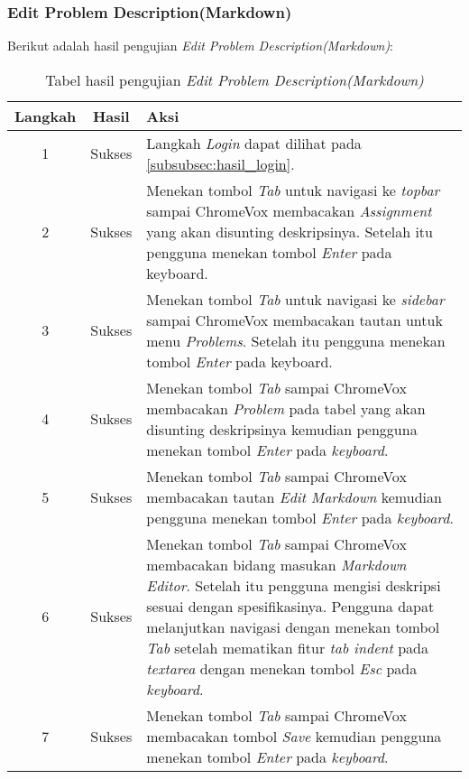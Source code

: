 \subsubsection{Edit Problem Description(Markdown)}
\label{subsubsec:hasil_edit_problem_description_markdown}
Berikut adalah hasil pengujian \textit{Edit Problem Description(Markdown)}:

\begin{table}[H]
	\centering
	\caption{Tabel hasil pengujian \textit{Edit Problem Description(Markdown)}}
	\label{tab:hasil_edit_problem_description_markdown}
	\begin{tabular}{|c|c|p{12cm}|}
		\toprule
		Langkah & Hasil & Aksi\\
		\midrule
		1 & Sukses & Langkah \textit{Login} dapat dilihat pada \ref{subsubsec:hasil_login}.\\
		2 & Sukses & Menekan tombol \textit{Tab} untuk navigasi ke \textit{topbar} sampai ChromeVox membacakan \textit{Assignment} yang akan disunting deskripsinya. Setelah itu pengguna menekan tombol \textit{Enter} pada keyboard.\\
		3 & Sukses & Menekan tombol \textit{Tab} untuk navigasi ke \textit{sidebar} sampai ChromeVox membacakan tautan untuk menu \textit{Problems}. Setelah itu pengguna menekan tombol \textit{Enter} pada keyboard.\\
		4 & Sukses & Menekan tombol \textit{Tab} sampai ChromeVox membacakan \textit{Problem} pada tabel yang akan disunting deskripsinya kemudian pengguna menekan tombol \textit{Enter} pada \textit{keyboard}.\\
		5 & Sukses & Menekan tombol \textit{Tab} sampai ChromeVox membacakan tautan \textit{Edit Markdown} kemudian pengguna menekan tombol \textit{Enter} pada \textit{keyboard}.\\
		6 & Sukses & Menekan tombol \textit{Tab} sampai ChromeVox membacakan bidang masukan \textit{Markdown Editor}. Setelah itu pengguna mengisi deskripsi sesuai dengan spesifikasinya. Pengguna dapat melanjutkan navigasi dengan menekan tombol \textit{Tab} setelah mematikan fitur \textit{tab indent} pada \textit{textarea} dengan menekan tombol \textit{Esc} pada \textit{keyboard}.\\
		7 & Sukses & Menekan tombol \textit{Tab} sampai ChromeVox membacakan tombol \textit{Save} kemudian pengguna menekan tombol \textit{Enter} pada \textit{keyboard}.\\
		\bottomrule
	\end{tabular}
\end{table}

